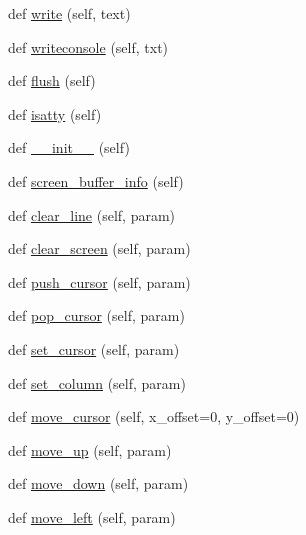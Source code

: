 \begin{DoxyCompactItemize}
def \hyperlink{classwaflib_1_1ansiterm_1_1_ansi_term_a03ecdf1c9e54a69800aae320175c281b}{write} (self, text)
\item 
def \hyperlink{classwaflib_1_1ansiterm_1_1_ansi_term_a8296f875a3fd0a03fc109073f2a73a3e}{writeconsole} (self, txt)
\item 
def \hyperlink{classwaflib_1_1ansiterm_1_1_ansi_term_a08667242c11cdfd8b74d64f8191d4938}{flush} (self)
\item 
def \hyperlink{classwaflib_1_1ansiterm_1_1_ansi_term_a08e698612e76adc1aa3e26cdc5cb2009}{isatty} (self)
\item 
def \hyperlink{classwaflib_1_1ansiterm_1_1_ansi_term_ab397a7401f836bb9f96d9e54c6333821}{\+\_\+\+\_\+init\+\_\+\+\_\+} (self)
\item 
def \hyperlink{classwaflib_1_1ansiterm_1_1_ansi_term_afdb1bac8f2508bdf2279320b85286196}{screen\+\_\+buffer\+\_\+info} (self)
\item 
def \hyperlink{classwaflib_1_1ansiterm_1_1_ansi_term_ae9df276c42e0569ad63c20c19de62b93}{clear\+\_\+line} (self, param)
\item 
def \hyperlink{classwaflib_1_1ansiterm_1_1_ansi_term_aa94cc04f29c4c51e0013e5cb87c0fd07}{clear\+\_\+screen} (self, param)
\item 
def \hyperlink{classwaflib_1_1ansiterm_1_1_ansi_term_a9f489138508401c64c6927f215d8d6da}{push\+\_\+cursor} (self, param)
\item 
def \hyperlink{classwaflib_1_1ansiterm_1_1_ansi_term_a2093c2f7ded18188b0bf2989a0083a18}{pop\+\_\+cursor} (self, param)
\item 
def \hyperlink{classwaflib_1_1ansiterm_1_1_ansi_term_aba842837a7fe351aa8459aa375249c69}{set\+\_\+cursor} (self, param)
\item 
def \hyperlink{classwaflib_1_1ansiterm_1_1_ansi_term_acd65956a7d56681cc669acca5bdd43fb}{set\+\_\+column} (self, param)
\item 
def \hyperlink{classwaflib_1_1ansiterm_1_1_ansi_term_ade95c6eb1c7ed7928780aad4e6b4e268}{move\+\_\+cursor} (self, x\+\_\+offset=0, y\+\_\+offset=0)
\item 
def \hyperlink{classwaflib_1_1ansiterm_1_1_ansi_term_a7725bd9ed185458669ad7601fb7ff9d9}{move\+\_\+up} (self, param)
\item 
def \hyperlink{classwaflib_1_1ansiterm_1_1_ansi_term_a7b2ea0403457b7cd8d0ac4088064d812}{move\+\_\+down} (self, param)
\item 
def \hyperlink{classwaflib_1_1ansiterm_1_1_ansi_term_a617dda0ced0a3e3f3443366d4a1c46bb}{move\+\_\+left} (self, param)
\item 

\end{DoxyCompactItemize}

